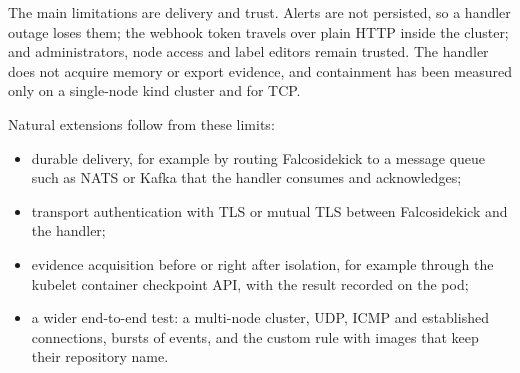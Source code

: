 The main limitations are delivery and trust. Alerts are not persisted, so a handler
outage loses them; the webhook token travels over plain HTTP inside the cluster;
and administrators, node access and label editors remain trusted. The handler does
not acquire memory or export evidence, and containment has been measured only on a
single-node kind cluster and for TCP.

Natural extensions follow from these limits:
\begin{itemize}
\item durable delivery, for example by routing Falcosidekick to a message queue
such as NATS or Kafka that the handler consumes and acknowledges;
\item transport authentication with TLS or mutual TLS between Falcosidekick and
the handler;
\item evidence acquisition before or right after isolation, for example through
the kubelet container checkpoint API, with the result recorded on the pod;
\item a wider end-to-end test: a multi-node cluster, UDP, ICMP and established
connections, bursts of events, and the custom rule with images that keep their
repository name.
\end{itemize}
